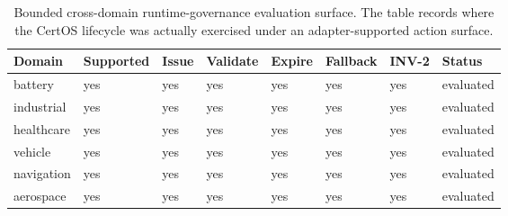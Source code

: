\begin{table}[htbp]
\centering
\caption{Bounded cross-domain runtime-governance evaluation surface. The table records where the CertOS lifecycle was actually exercised under an adapter-supported action surface.}
\label{tab:paper6-cross-domain}
\begin{tabular}{p{1.7cm}p{1.4cm}p{1.0cm}p{1.0cm}p{1.0cm}p{1.1cm}p{1.1cm}p{1.3cm}}
\toprule
\textbf{Domain} & \textbf{Supported} & \textbf{Issue} & \textbf{Validate} & \textbf{Expire} & \textbf{Fallback} & \textbf{INV-2} & \textbf{Status} \\
\midrule
battery & yes & yes & yes & yes & yes & yes & evaluated \\
industrial & yes & yes & yes & yes & yes & yes & evaluated \\
healthcare & yes & yes & yes & yes & yes & yes & evaluated \\
vehicle & yes & yes & yes & yes & yes & yes & evaluated \\
navigation & yes & yes & yes & yes & yes & yes & evaluated \\
aerospace & yes & yes & yes & yes & yes & yes & evaluated \\
\bottomrule
\end{tabular}
\end{table}
